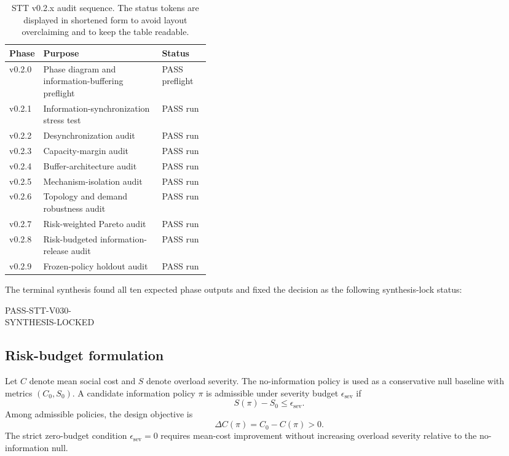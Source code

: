 \documentclass[11pt]{article}
\begin{document}
\begin{table}[H]
\centering
\small
\caption{STT v0.2.x audit sequence. The status tokens are displayed in shortened form to avoid layout overclaiming and to keep the table readable.}
\begin{tabularx}{\linewidth}{p{0.14\linewidth}X p{0.24\linewidth}}
\toprule
Phase & Purpose & Status \\
\midrule
v0.2.0 & Phase diagram and information-buffering preflight & PASS preflight \\
v0.2.1 & Information-synchronization stress test & PASS run \\
v0.2.2 & Desynchronization audit & PASS run \\
v0.2.3 & Capacity-margin audit & PASS run \\
v0.2.4 & Buffer-architecture audit & PASS run \\
v0.2.5 & Mechanism-isolation audit & PASS run \\
v0.2.6 & Topology and demand robustness audit & PASS run \\
v0.2.7 & Risk-weighted Pareto audit & PASS run \\
v0.2.8 & Risk-budgeted information-release audit & PASS run \\
v0.2.9 & Frozen-policy holdout audit & PASS run \\
\bottomrule
\end{tabularx}
\end{table}

The terminal synthesis found all ten expected phase outputs and fixed the decision as the following synthesis-lock status:
\begin{center}
\small\ttfamily
PASS-STT-V030-\\
SYNTHESIS-LOCKED
\end{center}

\subsection{Risk-budget formulation}
Let $C$ denote mean social cost and $S$ denote overload severity. The no-information policy is used as a conservative null baseline with metrics $(C_0,S_0)$. A candidate information policy $\pi$ is admissible under severity budget $\epsilon_{\mathrm{sev}}$ if
\begin{equation}
S(\pi)-S_0\leq \epsilon_{\mathrm{sev}}.
\end{equation}
Among admissible policies, the design objective is
\begin{equation}
\Delta C(\pi)=C_0-C(\pi)>0.
\end{equation}
The strict zero-budget condition $\epsilon_{\mathrm{sev}}=0$ requires mean-cost improvement without increasing overload severity relative to the no-information null.
\end{document}
